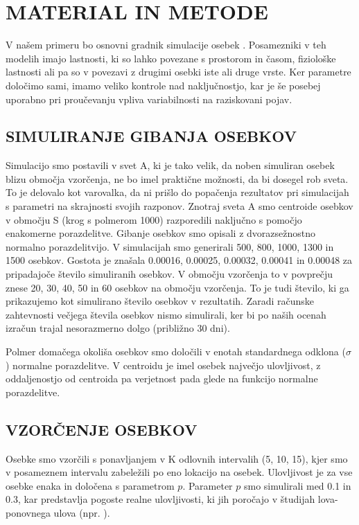 \section{MATERIAL IN METODE}
V našem primeru bo osnovni gradnik simulacije osebek \citep{deangelis_individual-based_2014}. Posamezniki v teh modelih imajo lastnosti, ki so lahko povezane s prostorom in časom, fiziološke lastnosti ali pa so v povezavi z drugimi osebki iste ali druge vrste. Ker parametre določimo sami, imamo veliko kontrole nad naključnostjo, kar je še posebej uporabno pri proučevanju vpliva variabilnosti na raziskovani pojav.

\subsection{SIMULIRANJE GIBANJA OSEBKOV}
Simulacijo smo postavili v svet A, ki je tako velik, da noben simuliran osebek blizu območja vzorčenja, ne bo imel praktične možnosti, da bi dosegel rob sveta. To je delovalo kot varovalka, da ni prišlo do popačenja rezultatov pri simulacijah s parametri na skrajnosti svojih razponov. Znotraj sveta A smo centroide osebkov v območju S (krog s polmerom 1000) razporedili naključno s pomočjo enakomerne porazdelitve. Gibanje osebkov smo opisali z dvorazsežnostno normalno porazdelitvijo. V simulacijah smo generirali 500, 800, 1000, 1300 in 1500 osebkov. Gostota je znašala 0.00016, 0.00025, 0.00032, 0.00041 in 0.00048 za pripadajoče število simuliranih osebkov. V območju vzorčenja to v povprečju znese 20, 30, 40, 50 in 60 osebkov na območju vzorčenja. To je tudi število, ki ga prikazujemo kot simulirano število osebkov v rezultatih. Zaradi računske zahtevnosti večjega števila osebkov nismo simulirali, ker bi po naših ocenah izračun trajal nesorazmerno dolgo (približno 30 dni).

Polmer domačega okoliša osebkov smo določili v enotah standardnega odklona ($\sigma$) normalne porazdelitve. V centroidu je imel osebek največjo ulovljivost, z oddaljenostjo od centroida pa verjetnost pada glede na funkcijo normalne porazdelitve.

\subsection{VZORČENJE OSEBKOV}
Osebke smo vzorčili s ponavljanjem v K odlovnih intervalih (5, 10, 15), kjer smo v posameznem intervalu zabeležili po eno lokacijo na osebek. Ulovljivost je za vse osebke enaka in določena s parametrom $p$. Parameter $p$ smo simulirali med 0.1 in 0.3, kar predstavlja pogoste realne ulovljivosti, ki jih poročajo v študijah lova-ponovnega ulova (npr. \citet{wilson_evaluation_1985, foster_critique_2012, chandler_characterizing_2018}).

